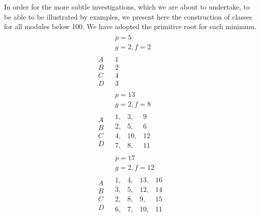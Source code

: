 \documentclass[twoside,12pt, showframe]{memoir}
\begin{document}
In order for the more subtle investigations, which we are about to undertake, to be able to be illustrated by examples, we present here the construction of classes for all modules below 100. We have adopted the primitive root for each minimum.
\[\begin{aligned}
& \begin{array}{c} p=5 \\  g=2, f=2 \end{array} \\
\begin{array}{l} A \\ B \\ C \\D \end{array} & \begin{array}{|r} 1 \\ 2 \\ 4 \\ 3 \end{array} \\
& \begin{array}{c} p=13 \\  g=2, f=8 \end{array} \\ 
\begin{array}{l} A \\ B \\ C \\D \end{array} & \begin{array}{|rrr} 1,& 3,& 9 \\ 2,& 5,&6 \\ 4,& 10,& 12 \\ 7,& 8,& 11 \end{array}\\
& \begin{array}{c} p=17 \\  g=2, f=12 \end{array} \\
\begin{array}{l} A \\ B \\ C \\D \end{array} & 
\begin{array}{|rrrr} 
1,& 4,&13,& 16 \\ 
3,& 5,&12,&14 \\
2,& 8,& 9,&15 \\ 
6,& 7,&10,&11 
\end{array} \\

\end{aligned}\]
\end{document}
